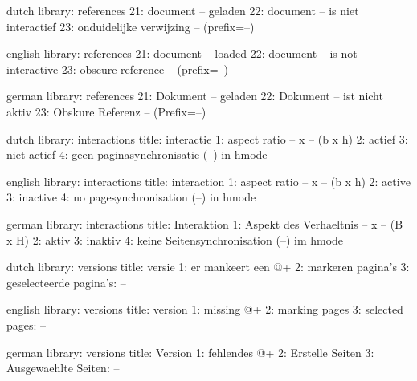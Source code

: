 

\unprotect

\startmessages  dutch  library: references
     21: document -- geladen
     22: document -- is niet interactief
     23: onduidelijke verwijzing -- (prefix=--)
\stopmessages

\startmessages  english  library: references
     21: document -- loaded
     22: document -- is not interactive
     23: obscure reference -- (prefix=--)
\stopmessages

\startmessages  german  library: references
     21: Dokument -- geladen
     22: Dokument -- ist nicht aktiv
     23: Obskure Referenz -- (Prefix=--)
\stopmessages

\startmessages  dutch  library: interactions
  title: interactie
      1: aspect ratio -- x -- (b x h)
      2: actief
      3: niet actief
      4: geen paginasynchronisatie (--) in hmode
\stopmessages

\startmessages  english  library: interactions
  title: interaction
      1: aspect ratio -- x -- (b x h)
      2: active
      3: inactive
      4: no pagesynchronisation (--) in hmode
\stopmessages

\startmessages  german  library: interactions
  title: Interaktion
      1: Aspekt des Verhaeltnis -- x -- (B x H)
      2: aktiv
      3: inaktiv
      4: keine Seitensynchronisation (--) im hmode
\stopmessages

\startmessages  dutch  library: versions
  title: versie
      1: er mankeert een @+
      2: markeren pagina's
      3: geselecteerde pagina's: --
\stopmessages

\startmessages  english  library: versions
  title: version
      1: missing @+
      2: marking pages
      3: selected pages: --
\stopmessages

\startmessages  german  library: versions
  title: Version
      1: fehlendes @+
      2: Erstelle Seiten
      3: Ausgewaehlte Seiten: --
\stopmessages



